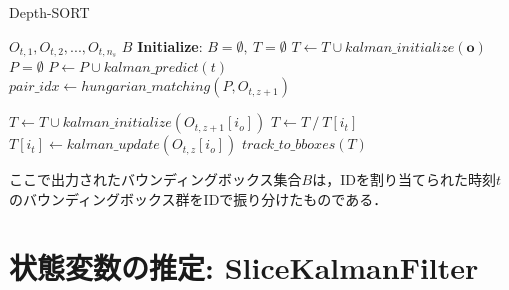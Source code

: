 \begin{algorithm}[H]
    \caption{Depth-SORT}
    \label{alg:Depth-SORT}
    \begin{algorithmic}[1]
        \REQUIRE $O_{t,1}, O_{t,2}, ..., O_{t,n_s}$
        \ENSURE $B$ 
        \STATE \textbf{Initialize}: $B = \emptyset,\ T = \emptyset$
            \STATE $T \leftarrow T \cup kalman\_initialize(\bm{o})$ 
        \ENDFOR
            \STATE $P = \emptyset$ 
                \STATE $P \leftarrow P \cup kalman\_predict(t)$ 
            \ENDFOR
            \STATE $pair\_idx \leftarrow hungarian\_matching(P, O_{t,z+1})$ 

                \STATE $T \leftarrow T \cup kalman\_initialize(O_{t,z+1}[i_o])$ 
                \STATE $T \leftarrow T\ /\ T[i_t]$ 
            \ELSE 
                \STATE $T[i_t] \leftarrow kalman\_update(O_{t,z}[i_o])$ 
            \ENDIF
    \ENDFOR
        \ENDFOR
        \RETURN $track\_to\_bboxes(T)$
    \end{algorithmic}
\end{algorithm}

ここで出力されたバウンディングボックス集合$B$は，IDを割り当てられた時刻$t$のバウンディングボックス群をIDで振り分けたものである．

\section{状態変数の推定: SliceKalmanFilter}